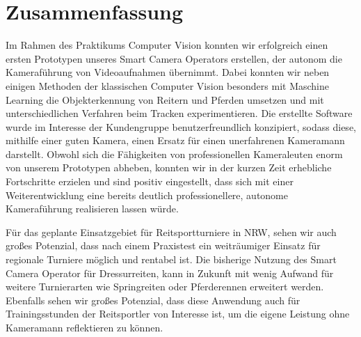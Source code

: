 \chapter{Zusammenfassung }
\label{ch:zusammenfassung}


Im Rahmen des Praktikums Computer Vision konnten wir erfolgreich einen ersten Prototypen unseres Smart Camera Operators erstellen, der autonom die Kameraführung von Videoaufnahmen übernimmt. Dabei konnten wir neben einigen Methoden der klassischen Computer Vision besonders mit Maschine Learning die Objekterkennung von Reitern und Pferden umsetzen und mit unterschiedlichen Verfahren beim Tracken experimentieren. Die erstellte Software wurde im Interesse der Kundengruppe benutzerfreundlich konzipiert, sodass diese, mithilfe einer guten Kamera, einen Ersatz für einen unerfahrenen Kameramann darstellt. Obwohl sich die Fähigkeiten von professionellen Kameraleuten enorm von unserem Prototypen abheben, konnten wir in der kurzen Zeit erhebliche Fortschritte erzielen und sind positiv eingestellt, dass sich mit einer Weiterentwicklung eine bereits deutlich professionellere, autonome Kameraführung realisieren lassen würde.

Für das geplante Einsatzgebiet für Reitsportturniere in NRW, sehen wir auch großes Potenzial, dass nach einem Praxistest ein weiträumiger Einsatz für regionale Turniere möglich und rentabel ist. 
Die bisherige Nutzung des Smart Camera Operator für Dressurreiten, kann in Zukunft mit wenig Aufwand für weitere Turnierarten wie Springreiten oder Pferderennen erweitert werden. Ebenfalls sehen wir großes Potenzial, dass diese Anwendung auch für Trainingsstunden der Reitsportler von Interesse ist, um die eigene Leistung ohne Kameramann reflektieren zu können.